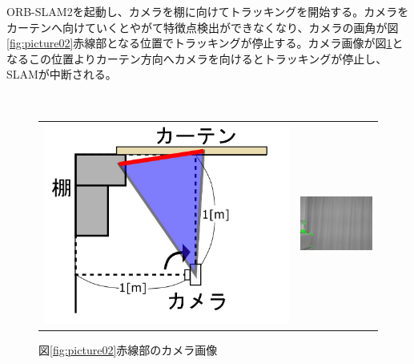 ORB-SLAM2を起動し、カメラを棚に向けてトラッキングを開始する。カメラをカーテンへ向けていくとやがて特徴点検出ができなくなり、カメラの画角が図\ref{fig:picture02}赤線部となる位置でトラッキングが停止する。カメラ画像が図\ref{fig:Tracking02}となるこの位置よりカーテン方向へカメラを向けるとトラッキングが停止し、SLAMが中断される。

\begin{figure}[h]
　\begin{tabular}{cc}
      \begin{minipage}[t]{0.45\hsize}
        \centering
        \includegraphics[width=1.0\linewidth]{figs/picture02.jpg}
        \caption{実験概略図}
        \label{fig:picture02}
        \end{minipage} &

      \begin{minipage}[t]{0.45\hsize}
        \centering
        \includegraphics[width=1.0\linewidth]{figs/Tracking02.jpg}
        \caption{図\ref{fig:picture02}赤線部のカメラ画像}
        \label{fig:Tracking02}
  \end{minipage}

 \end{tabular}
\end{figure}

